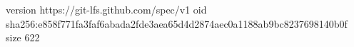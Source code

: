 version https://git-lfs.github.com/spec/v1
oid sha256:e858f771fa3faf6abada2fde3aea65d4d2874aec0a1188ab9bc8237698140b0f
size 622
